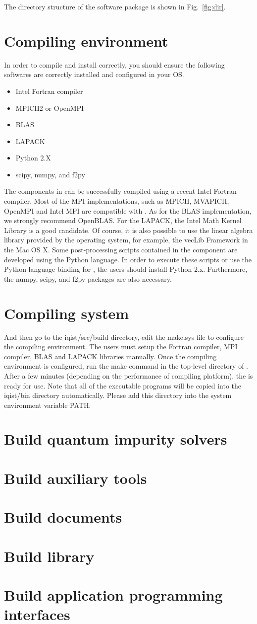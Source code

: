 The directory structure of the {\iqist} software package is shown in Fig.~\ref{fig:dir}.

\section{Compiling environment}

In order to compile and install {\iqist} correctly, you should ensure the following softwares are correctly installed and configured in your OS.
\begin{itemize}
\item Intel Fortran compiler
\item MPICH2 or OpenMPI
\item BLAS
\item LAPACK
\item Python 2.X
\item scipy, numpy, and f2py
\end{itemize}
The components in {\iqist} can be successfully compiled using a recent Intel Fortran compiler. Most of the MPI implementations, such as MPICH, MVAPICH, OpenMPI and Intel MPI are compatible with {\iqist}. As for the BLAS implementation, we strongly recommend OpenBLAS. For the LAPACK, the Intel Math Kernel Library is a good candidate. Of course, it is also possible to use the linear algebra library provided by the operating system, for example, the vecLib Framework in the Mac OS X. Some post-processing scripts contained in the {\hibiscus} component are developed using the Python language. In order to execute these scripts or use the Python language binding for {\iqist}, the users should install Python 2.x. Furthermore, the numpy, scipy, and f2py packages are also necessary.

\section{Compiling system}

And then go to the iqist/src/build directory, edit the make.sys file to configure the compiling environment. The users must setup the Fortran compiler, MPI compiler, BLAS and LAPACK libraries manually. Once the compiling environment is configured, run the make command in the top-level directory of {\iqist}. After a few minutes (depending on the performance of compiling platform), the {\iqist} is ready for use. Note that all of the executable programs will be copied into the iqist/bin directory automatically. Please add this directory into the system environment variable PATH.

\section{Build quantum impurity solvers}
\section{Build auxiliary tools}
\section{Build documents}
\section{Build library}
\section{Build application programming interfaces}
